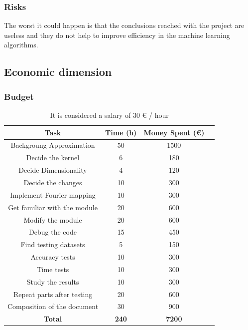 \documentclass[a4paper]{article}
\begin{document}
            \subsubsection{Risks}
                The worst it could happen is that the conclusions reached with the project are useless and they do not help to improve efficiency in the machine learning algorithms.

        \subsection{Economic dimension}
            \subsubsection{Budget}
            \begin{table}
                \centering
                \begin{tabular}{|c|c|c|c|}
                    \hline
                    \textbf{Task} & \textbf{Time (h)} & \textbf{Money Spent (€)} \\
                    \hline
                    Backgroung Approximation & 50 & 1500 \\
                    \hline
                    Decide the kernel & 6 & 180 \\
                    \hline
                    Decide Dimensionality & 4 & 120 \\
                    \hline
                    Decide the changes & 10 & 300 \\
                    \hline
                    Implement Fourier mapping & 10 & 300 \\
                    \hline
                    Get familiar with the module & 20 & 600 \\
                    \hline
                    Modify the module & 20 & 600 \\
                    \hline
                    Debug the code & 15 & 450 \\
                    \hline
                    Find testing datasets & 5 & 150 \\
                    \hline
                    Accuracy tests & 10 & 300 \\
                    \hline
                    Time tests & 10 & 300 \\
                    \hline
                    Study the results & 10 & 300 \\
                    \hline
                    Repeat parts after testing & 20 & 600 \\
                    \hline
                    Composition of the document & 30 & 900 \\
                    \hline
                    \textbf{Total} & \textbf{240} & \textbf{7200} \\
                    \hline

                \end{tabular}
                \caption{It is considered a salary of 30 € / hour}
                \label{Tab:1}
            \end{table}
\end{document}
